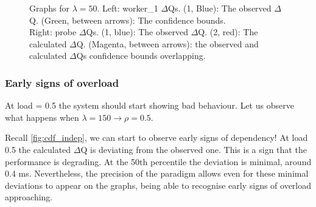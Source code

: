 \begin{figure}[H]
\begin{subfigure}{.5\textwidth}
                \label{fig:norm_ex_2}
            \end{subfigure}
            \label{fig:norm_ex}
            \caption{Graphs for $\lambda = 50$. Left: worker\_1 $\Delta$Qs. (1, Blue): The observed $\Delta$Q. (Green, between arrows): The confidence bounds. \\
            Right: probe $\Delta$Qs. (1, blue): The observed $\Delta$Q. (2, red): The calculated $\Delta$Q. (Magenta, between arrows): the observed and calculated $\Delta$Qs confidence bounds overlapping.}
        \end{figure}
    
\subsubsection{Early signs of overload}
    
    At load = 0.5 the system should start showing bad behaviour. Let us observe what happens when $\lambda = 150 \rightarrow \rho = 0.5$.
    
    Recall \ref{fig:cdf_indep}, we can start to observe early signs of dependency! At load 0.5 the calculated $\Delta$Q is deviating from the observed one. This is a sign that the performance is degrading. At the 50th percentile the deviation is minimal, around 0.4 ms. Nevertheless, the precision of the paradigm allows even for these minimal deviations to appear on the graphs, being able to recognise early signs of overload approaching.
 

